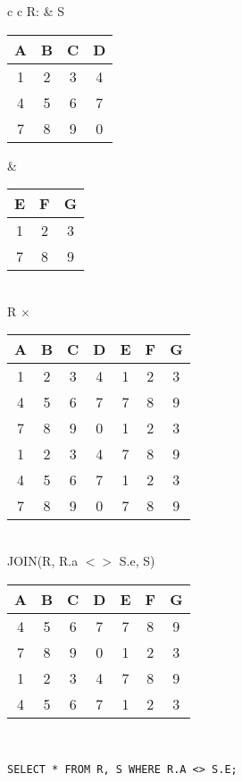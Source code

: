 \begin{tabular}{ c c}
	R: & S \\
	\begin{tabular}{|c|c|c|c|}
		\hline
		A & B & C & D\\
		\hline
		1 & 2 & 3 & 4\\
		\hline
		4 & 5 & 6 & 7\\
		\hline
		7 & 8 & 9 & 0\\
		\hline
	\end{tabular} &

	\begin{tabular}{|c|c|c|}
		\hline
		E & F & G \\
		\hline
		1 & 2 & 3\\
		\hline
		7 & 8 & 9\\
		\hline
	\end{tabular}
\end{tabular}\\

R $\times$ \\
\begin{tabular}{|c|c|c|c|c|c|c|}
	\hline
	A & B & C & D & E & F & G\\
	\hline
	1 & 2 & 3 & 4 & 1 & 2 & 3\\
	\hline
	4 & 5 & 6 & 7 & 7 & 8 & 9\\
	\hline
	7 & 8 & 9 & 0 & 1 & 2 & 3\\
	\hline                     
	1 & 2 & 3 & 4 & 7 & 8 & 9\\
	\hline
	4 & 5 & 6 & 7 & 1 & 2 & 3\\
	\hline                     
	7 & 8 & 9 & 0 & 7 & 8 & 9\\
	\hline
\end{tabular}\\

JOIN(R, R.a $<>$ S.e, S)\\
\begin{tabular}{|c|c|c|c|c|c|c|}
	\hline
	A & B & C & D & E & F & G\\
	\hline
	4 & 5 & 6 & 7 & 7 & 8 & 9\\
	\hline
	7 & 8 & 9 & 0 & 1 & 2 & 3\\
	\hline                     
	1 & 2 & 3 & 4 & 7 & 8 & 9\\
	\hline
	4 & 5 & 6 & 7 & 1 & 2 & 3\\
	\hline
\end{tabular}\\

\lstset{language=SQL,tabsize=4,captionpos=b,frame=single,
basicstyle=\footnotesize}
\begin{lstlisting}[caption=SQL NoEqui-Join]
SELECT * FROM R, S WHERE R.A <> S.E;
\end{lstlisting}

